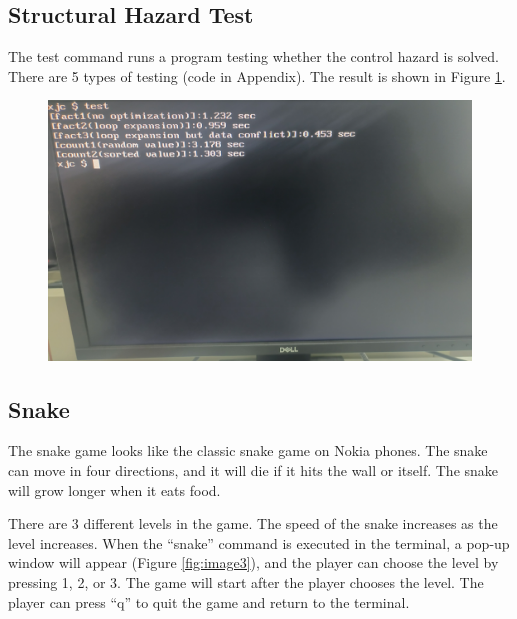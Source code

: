 \documentclass[
	a4paper, %
	11pt, %
]{CSUniSchoolLabReport}
\begin{document}
\subsection{Structural Hazard Test}
The test command runs a program testing whether the control hazard is solved. There are 5 types of testing (code in Appendix). The result is shown in Figure \ref{fig:image9}.
\begin{figure}[!htb]
    \centering
    \includegraphics[width=12cm]{image9.png}
    \label{fig:image9}
\end{figure}


\subsection{Snake}
The snake game looks like the classic snake game on Nokia phones. The snake can move in four directions, and it will die if it hits the wall or itself. The snake will grow longer when it eats food.

There are 3 different levels in the game. The speed of the snake increases as the level increases. When the ``snake'' command is executed in the terminal, a pop-up window will appear (Figure \ref{fig:image3}), and the player can choose the level by pressing 1, 2, or 3. The game will start after the player chooses the level. The player can press ``q'' to quit the game and return to the terminal.
\end{document}
